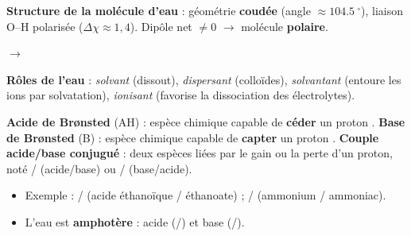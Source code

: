 \documentclass[11pt]{article}
\providecommand{\degree}{^{\circ}}
\newcommand{\cle}[1]{{\popxbold\color{popdark}#1}}
\begin{document}
\begin{definition}
\textbf{Structure de la molécule d'eau} : géométrie \textbf{coudée} (angle $\approx \SI{104,5}{\degree}$), liaison O--H polarisée ($\Delta\chi \approx 1,4$). Dipôle net $\neq 0$ $\rightarrow$ molécule \textbf{polaire}.
\begin{center}
 \quad $\rightarrow$ \quad {}
\end{center}
\textbf{Rôles de l'eau} : \emph{solvant} (dissout), \emph{dispersant} (colloïdes), \emph{solvantant} (entoure les ions par solvatation), \emph{ionisant} (favorise la dissociation des électrolytes).

\medskip
\textbf{Acide de Brønsted} (\cle{AH}) : espèce chimique capable de \textbf{céder} un proton .
\textbf{Base de Brønsted} (\cle{B}) : espèce chimique capable de \textbf{capter} un proton .
\textbf{Couple acide/base conjugué} : deux espèces liées par le gain ou la perte d'un proton, noté / (acide/base) ou / (base/acide).
\begin{itemize}
  \item Exemple : / (acide éthanoïque / éthanoate) ; / (ammonium / ammoniac).
  \item L'eau est \textbf{amphotère} : acide (/) et base (/).
\end{itemize}
\end{definition}
\end{document}
